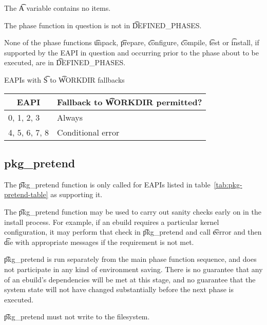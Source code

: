 \begin{compactitem}
\item The \t{A} variable contains no items.
\item The phase function in question is not in \t{DEFINED_PHASES}.
\item None of the phase functions \t{unpack}, \t{prepare}, \t{configure}, \t{compile}, \t{test} or
    \t{install}, if supported by the EAPI in question and occurring prior to the phase about to be
    executed, are in \t{DEFINED_PHASES}.
\end{compactitem}

\begin{centertable}{EAPIs with \t{S} to \t{WORKDIR} fallbacks}
    \label{tab:s-fallback-table}
    \begin{tabular}{ll}
      \toprule
      \multicolumn{1}{c}{\textbf{EAPI}} &
      \multicolumn{1}{c}{\textbf{Fallback to \t{WORKDIR} permitted?}} \\
      \midrule
      0, 1, 2, 3        & Always            \\
      4, 5, 6, 7, 8     & Conditional error \\
      \bottomrule
    \end{tabular}
\end{centertable}

\subsection{pkg_pretend}

 The \t{pkg_pretend} function is only called for EAPIs listed in
table~\ref{tab:pkg-pretend-table} as supporting it.

The \t{pkg_pretend} function may be used to carry out sanity checks early on in the install
process. For example, if an ebuild requires a particular kernel configuration, it may perform that
check in \t{pkg_pretend} and call \t{eerror} and then \t{die} with appropriate messages if the
requirement is not met.

\t{pkg_pretend} is run separately from the main phase function sequence, and does not participate
in any kind of environment saving. There is no guarantee that any of an ebuild's dependencies will
be met at this stage, and no guarantee that the system state will not have changed substantially
before the next phase is executed.

\t{pkg_pretend} must not write to the filesystem.

